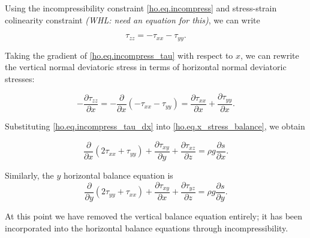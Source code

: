 \noindent
Using the incompressibility constraint \eqref{ho.eq.incompress} and stress-strain colinearity constraint \textit{(WHL: need an equation for this)}, 
we can write

\begin{equation}
  \label{ho.eq.incompress_tau}
  \tau _{zz} = -\tau _{xx}-\tau _{yy}.
\end{equation}

\noindent
Taking the gradient of \eqref{ho.eq.incompress_tau} with respect to $x$, we can rewrite the vertical normal deviatoric stress in terms of horizontal normal deviatoric stresses:

\begin{equation}
  \label{ho.eq.incompress_tau_dx}
  -\frac{\partial \tau _{zz}}{\partial x} = -\frac{\partial }{\partial x}\left( -\tau _{xx} - \tau _{yy} \right) = \frac{\partial \tau _{xx}}{\partial x} + \frac{\partial \tau _{yy}}{\partial x}.
\end{equation}
 
\noindent
Substituting \eqref{ho.eq.incompress_tau_dx} into \eqref{ho.eq.x_stress_balance}, we obtain
 
\begin{equation}
  \label{ho.eq.stress_balance_x}
  \frac{\partial }{\partial x} \left( 2 \tau_{xx} + \tau_{yy} \right) + \frac{\partial \tau _{xy}}{\partial y} + \frac{\partial \tau _{xz}}{\partial z} = \rho g\frac{\partial s}{\partial x}.
\end{equation}

\noindent
Similarly, the $y$ horizontal balance equation is
\begin{equation}
  \label{ho.eq.stress_balance_y}
  \frac{\partial }{\partial y} \left( 2 \tau_{yy} + \tau_{xx} \right) + \frac{\partial \tau _{xy}}{\partial x} + \frac{\partial \tau _{yz}}{\partial z} = \rho g\frac{\partial s}{\partial y}.
\end{equation}

\noindent 
At this point we have removed the vertical balance equation entirely; it has been incorporated into the horizontal balance equations through incompressibility.



